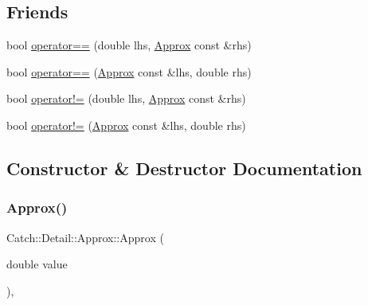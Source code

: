 \subsection*{Friends}
\begin{DoxyCompactItemize}
\item 
bool \hyperlink{class_catch_1_1_detail_1_1_approx_ac766f044f1c63f0c5997982baefd9049}{operator==} (double lhs, \hyperlink{class_catch_1_1_detail_1_1_approx}{Approx} const \&rhs)
\item 
bool \hyperlink{class_catch_1_1_detail_1_1_approx_a35999631e6cef569f9da9f3fa910db22}{operator==} (\hyperlink{class_catch_1_1_detail_1_1_approx}{Approx} const \&lhs, double rhs)
\item 
bool \hyperlink{class_catch_1_1_detail_1_1_approx_a83b3763569a7ecc143c335b630be0e47}{operator!=} (double lhs, \hyperlink{class_catch_1_1_detail_1_1_approx}{Approx} const \&rhs)
\item 
bool \hyperlink{class_catch_1_1_detail_1_1_approx_a7497ef839f8026cc0edd6269a80f3e09}{operator!=} (\hyperlink{class_catch_1_1_detail_1_1_approx}{Approx} const \&lhs, double rhs)
\end{DoxyCompactItemize}


\subsection{Constructor \& Destructor Documentation}
\hypertarget{class_catch_1_1_detail_1_1_approx_a1a8618ea8db08c66bd3d9fe8f74b957a}{}\label{class_catch_1_1_detail_1_1_approx_a1a8618ea8db08c66bd3d9fe8f74b957a} 
\subsubsection{\texorpdfstring{Approx()}{Approx()}\hspace{0.1cm}{\footnotesize\ttfamily [1/2]}}
{\footnotesize\ttfamily Catch\+::\+Detail\+::\+Approx\+::\+Approx (\begin{DoxyParamCaption}\item[{double}]{value }\end{DoxyParamCaption})\hspace{0.3cm}{\ttfamily [inline]}, {\ttfamily [explicit]}}

\hypertarget{class_catch_1_1_detail_1_1_approx_a807330c63266fc914abdf6e461255a54}{}\label{class_catch_1_1_detail_1_1_approx_a807330c63266fc914abdf6e461255a54} 
